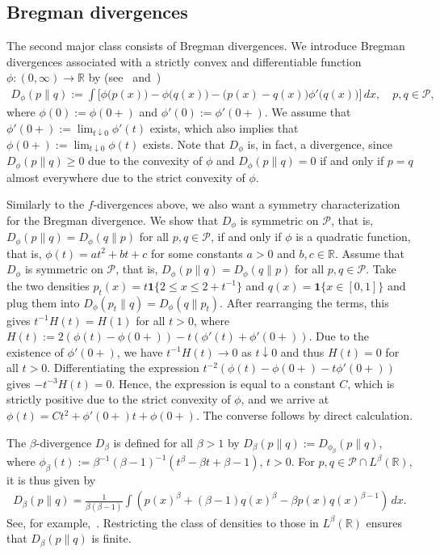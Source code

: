 \subsection{Bregman divergences}\label{sec:bregman_divergences}

The second major class consists of Bregman divergences. We introduce Bregman divergences associated with a strictly convex and differentiable function $\phi:(0,\infty)\to\mathbb{R}$ by (see~\cite[Equation~(53)]{cichocki_families_2010} and~\cite[Example~3.2]{ovcharov_proper_2018})
\begin{align*}
    D_{\phi}(p\|q):=\int\bigg[\phi\big(p(x)\big)-\phi\big(q(x)\big)-\big(p(x)-q(x)\big)\phi'\big(q(x)\big)\bigg]\,dx,\quad p,q\in\mathcal{P},
\end{align*}
where $\phi(0):=\phi(0+)$ and $\phi'(0):=\phi'(0+)$. We assume that $\phi'(0+):=\lim_{t\downarrow0}\phi'(t)$ exists, which also implies that $\phi(0+):=\lim_{t\downarrow0}\phi(t)$ exists. Note that $D_{\phi}$ is, in fact, a divergence, since $D_{\phi}(p\|q)\ge0$ due to the convexity of $\phi$ and $D_{\phi}(p\|q)=0$ if and only if $p=q$ almost everywhere due to the strict convexity of $\phi$.

Similarly to the $f$-divergences above, we also want a symmetry characterization for the Bregman divergence. We show that $D_{\phi}$ is symmetric on $\mathcal{P}$, that is, $D_{\phi}(p\|q)=D_{\phi}(q\|p)$ for all $p,q\in\mathcal{P}$, if and only if $\phi$ is a quadratic function, that is, $\phi(t)=at^2+bt+c$ for some constants $a>0$ and $b,c\in\mathbb{R}$. Assume that $D_{\phi}$ is symmetric on $\mathcal{P}$, that is, $D_{\phi}(p\|q)=D_{\phi}(q\|p)$ for all $p,q\in\mathcal{P}$. Take the two densities $p_t(x)=t\mathbf{1}\{2\le x\le 2+t^{-1}\}$ and $q(x)=\mathbf{1}\{x\in[0,1]\}$ and plug them into $D_{\phi}(p_t\|q)=D_{\phi}(q\|p_t)$. After rearranging the terms, this gives $t^{-1}H(t)=H(1)$ for all $t>0$, where $H(t):=2(\phi(t)-\phi(0+))-t(\phi'(t)+\phi'(0+))$. Due to the existence of $\phi'(0+)$, we have $t^{-1}H(t)\to0$ as $t\downarrow0$ and thus $H(t)=0$ for all $t>0$. Differentiating the expression $t^{-2}(\phi(t)-\phi(0+)-t\phi'(0+))$ gives $-t^{-3}H(t)=0$. Hence, the expression is equal to a constant $C$, which is strictly positive due to the strict convexity of $\phi$, and we arrive at $\phi(t)=Ct^2+\phi'(0+)t+\phi(0+)$. The converse follows by direct calculation.

The $\beta$-divergence $D_{\beta}$ is defined for all $\beta>1$ by $D_{\beta}(p\|q):=D_{\phi_{\beta}}(p\|q)$, where $\phi_{\beta}(t):=\beta^{-1}(\beta-1)^{-1}(t^{\beta}-\beta t+\beta-1)$, $t>0$. For $p,q\in\mathcal{P}\cap L^{\beta}(\mathbb{R})$, it is thus given by
\begin{align*}
    D_{\beta}(p\|q)=\frac{1}{\beta(\beta-1)}\int\left(p(x)^{\beta}+(\beta-1)q(x)^{\beta}-\beta p(x)q(x)^{\beta-1}\right)\,dx.
\end{align*}
See, for example,~\cite[Equation~(51)]{cichocki_families_2010}. Restricting the class of densities to those in $L^{\beta}(\mathbb{R})$ ensures that $D_{\beta}(p\|q)$ is finite.

